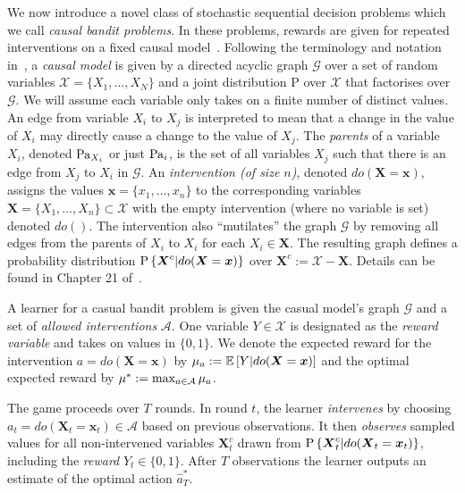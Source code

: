 \newcommand{\bernoulli}{\operatorname{Bernoulli}}
\newcommand{\dirac}{\operatorname{Dirac}}
\renewcommand{\vec}[1]{\boldsymbol{#1}}

We now introduce a novel class of stochastic sequential decision problems which we call \emph{causal bandit problems}. 
In these problems, rewards are given for repeated interventions on a fixed causal model~\cite{Pearl2000}. 
Following the terminology and notation in~\cite{Koller2009}, a \emph{causal model} is given by a directed acyclic graph $\mathcal{G}$ over a set of random variables $\mathcal{X} = \{ X_1, \ldots, X_N \}$ and a joint distribution $\mathrm{P}$ over $\mathcal{X}$ that factorises over $\mathcal{G}$.
We will assume each variable only takes on a finite number of distinct values.
An edge from variable $X_i$ to $X_j$ is interpreted to mean that a change in the value of $X_i$ may directly cause a change to the value of $X_j$.
The \emph{parents} of a variable $X_i$, denoted $\operatorname{Pa}_{X_i}$ or just $\operatorname{Pa}_{i}$, is the set of all variables $X_j$ such that there is an edge from $X_j$ to $X_i$ in $\mathcal{G}$.
An \emph{intervention (of size $n$)}, denoted $do(\vec{X}=\vec{x})$, assigns the values $\vec{x}=\{x_1, \ldots, x_n\}$ to the corresponding variables $\vec{X}=\{X_1, \ldots, X_n\} \subset \mathcal{X}$ with the empty intervention (where no variable is set) denoted $do()$.
The intervention also ``mutilates'' the graph $\mathcal{G}$ by removing all edges from the parents of $X_i$ to $X_i$ for each $X_i \in \vec{X}$. 
The resulting graph defines a probability distribution $\P{\vec{X}^c | do(\vec{X}=\vec{x})}$ over $\vec{X}^c := \mathcal{X} - \vec{X}$. 
Details can be found in Chapter 21 of~\cite{Koller2009}.

A learner for a casual bandit problem is given the casual model's graph $\mathcal{G}$ and a set of \emph{allowed interventions} $\mathcal{A}$.
One variable $Y \in \mathcal{X}$ is designated as the \emph{reward variable} and takes on values in $\{0, 1\}$.
We denote the expected reward for the intervention $a = do(\vec{X} = \vec{x})$ by $\mu_{a} := \E{Y | do(\vec{X} = \vec{x})}$ and 
the optimal expected reward by $\mu^* := \max_{a\in\mathcal{A}} \mu_{a}$. 

The game proceeds over $T$ rounds.
In round $t$, the learner \emph{intervenes} by choosing $a_t = do(\vec{X}_t = \vec{x}_t) \in \mathcal{A}$ based on previous observations. 
It then \emph{observes} sampled values for all non-intervened variables $\vec{X}^c_t$ drawn from $\P{\vec{X}^c_t | do(\vec{X}_t = \vec{x}_t)}$, 
including the \emph{reward} $Y_t \in \{0,1\}$. 
After $T$ observations the learner outputs an estimate of the optimal action $\hat a^*_T$.

